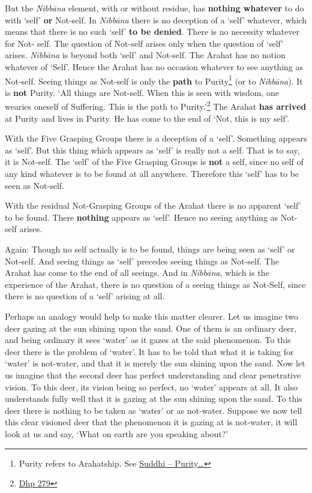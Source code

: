 But the \emph{Nibbāna} element, with or without residue, has \textbf{nothing whatever} to do with `self' \textbf{or} Not-self. In \emph{Nibbāna} there is no deception of a `self' whatever, which means that there is no such `self' \textbf{to be denied}. There is no necessity whatever for Not- self. The question of Not-self arises only when the question of `self' arises. \emph{Nibbāna} is beyond both `self' and Not-self. The Arahat has no notion whatever of `Self'. Hence the Arahat has no occasion whatever to see anything as Not-self. Seeing things as Not-self is only the \textbf{path} to Purity\footnote{Purity refers to Arahatship. See \protect\hyperlink{suddhi}{Suddhi -- Purity\ldots\hspace{0pt}}} (or to \emph{Nibbāna}). It is \textbf{not} Purity. `All things are Not-self. When this is seen with wisdom, one wearies oneself of Suffering. This is the path to Purity.'\footnote{\href{https://suttacentral.net/dhp273-289/en/anandajoti}{Dhp 279}} The Arahat \textbf{has arrived} at Purity and lives in Purity. He has come to the end of `Not, this is my self'.

With the Five Grasping Groups there is a deception of a `self'. Something appears as `self'. But this thing which appears as `self' is really not a self. That is to say, it is Not-self. The `self' of the Five Grasping Groups is \textbf{not} a self, since no self of any kind whatever is to be found at all anywhere. Therefore this `self' has to be seen as Not-self.

With the residual Not-Grasping Groups of the Arahat there is no apparent `self' to be found. There \textbf{nothing} appears as `self'. Hence no seeing anything as Not-self arises.

Again: Though no self actually is to be found, things are being seen as `self' or Not-self. And seeing things as `self' precedes seeing things as Not-self. The Arahat has come to the end of all seeings. And in \emph{Nibbāna}, which is the experience of the Arahat, there is no question of a seeing things as Not-Self, since there is no question of a `self' arising at all.

Perhaps an analogy would help to make this matter clearer. Let us imagine two deer gazing at the sun shining upon the sand. One of them is an ordinary deer, and being ordinary it sees `water' as it gazes at the said phenomenon. To this deer there is the problem of `water'. It has to be told that what it is taking for `water' is not-water, and that it is merely the sun shining upon the sand. Now let us imagine that the second deer has perfect understanding and clear penetrative vision. To this deer, its vision being so perfect, no `water' appears at all. It also understands fully well that it is gazing at the sun shining upon the sand. To this deer there is nothing to be taken as `water' or as not-water. Suppose we now tell this clear visioned deer that the phenomenon it is gazing at is not-water, it will look at us and say, `What on earth are you speaking about?'

